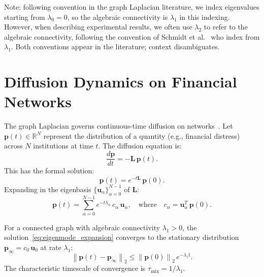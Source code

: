 Note: following convention in the graph Laplacian literature, we index
eigenvalues starting from $\lambda_0 = 0$, so the algebraic
connectivity is $\lambda_1$ in this indexing.  However, when describing
experimental results, we often use $\lambda_2$ to refer to the algebraic
connectivity, following the convention of Schmidt et
al.~\cite{schmidt2024spectral} who index from $\lambda_1$.  Both
conventions appear in the literature; context disambiguates.


\section{Diffusion Dynamics on Financial Networks}
\label{sec:diffusion_theory}

The graph Laplacian governs continuous-time diffusion on
networks~\cite{masuda2017random}.  Let $\mathbf{p}(t) \in \mathbb{R}^N$
represent the distribution of a quantity (e.g., financial distress)
across $N$ institutions at time $t$.  The diffusion equation is:
\begin{equation}
\frac{d\mathbf{p}}{dt} = -\mathbf{L}\,\mathbf{p}(t).
\label{eq:diffusion_eq}
\end{equation}
This has the formal solution:
\begin{equation}
\mathbf{p}(t) = e^{-t\mathbf{L}}\,\mathbf{p}(0).
\label{eq:diffusion_matrix_exp}
\end{equation}
Expanding in the eigenbasis $\{\mathbf{u}_\alpha\}_{\alpha=0}^{N-1}$ of
$\mathbf{L}$:
\begin{equation}
\mathbf{p}(t) = \sum_{\alpha=0}^{N-1} e^{-t\lambda_\alpha}\,
c_\alpha\,\mathbf{u}_\alpha,
\quad\text{where}\quad
c_\alpha = \mathbf{u}_\alpha^T\,\mathbf{p}(0).
\label{eq:eigenmode_expansion}
\end{equation}

\begin{theorem}
\label{thm:convergence}
For a connected graph with algebraic connectivity $\lambda_1 > 0$, the
solution~\eqref{eq:eigenmode_expansion} converges to the stationary
distribution $\mathbf{p}_\infty = c_0\,\mathbf{u}_0$ at rate
$\lambda_1$:
\begin{equation}
\left\|\mathbf{p}(t) - \mathbf{p}_\infty\right\|_2
\leq \left\|\mathbf{p}(0)\right\|_2\,e^{-\lambda_1 t}.
\label{eq:convergence_bound}
\end{equation}
The characteristic timescale of convergence is
$\tau_{\text{mix}} = 1/\lambda_1$.
\end{theorem}

